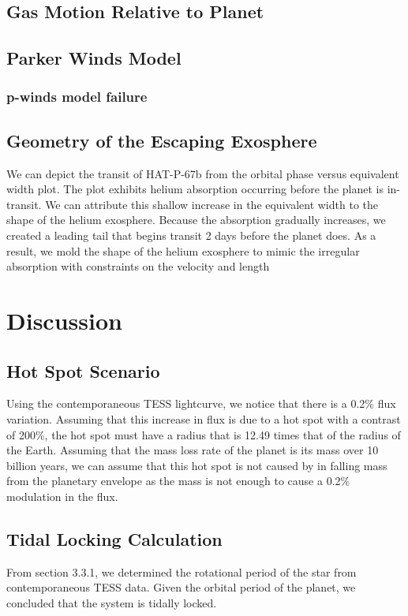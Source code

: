 \documentclass[modern]{aastex631}
\begin{document}
\subsection{Gas Motion Relative to Planet}
\subsection{Parker Winds Model}
\subsubsection{p-winds model failure}
\subsection{Geometry of the Escaping Exosphere}
We can depict the transit of HAT-P-67b from the orbital phase versus equivalent width plot. The plot exhibits helium absorption occurring before the planet is in-transit. We can attribute this shallow increase in the equivalent width to the shape of the helium exosphere. Because the absorption gradually increases, we created a leading tail that begins transit 2 days before the planet does. As a result, we mold the shape of the helium exosphere to mimic the irregular absorption with constraints on the velocity and length

\section{Discussion}
\subsection{Hot Spot Scenario}
Using the contemporaneous TESS lightcurve, we notice that there is a 0.2\% flux variation. Assuming that this increase in flux is due to a hot spot with a contrast of 200\%, the hot spot must have a radius that is 12.49 times that of the radius of the Earth. Assuming that the mass loss rate of the planet is its mass over 10 billion years, we can assume that this hot spot is not caused by in falling mass from the planetary envelope as the mass is not enough to cause a 0.2\% modulation in the flux.

\subsection{Tidal Locking Calculation}
From section 3.3.1, we determined the rotational period of the star from contemporaneous TESS data. Given the orbital period of the planet, we concluded that the system is tidally locked.
\end{document}
